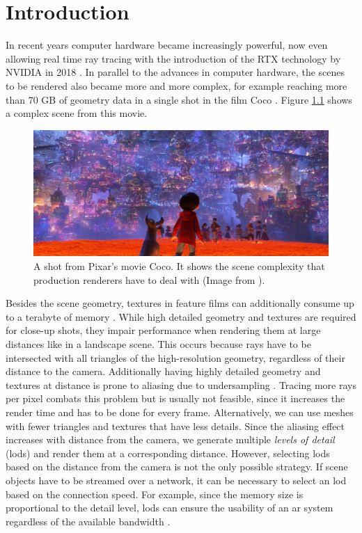 \chapter{Introduction}
\label{chap:intro}

In recent years computer hardware became increasingly powerful, now even allowing real time ray tracing with the introduction of the RTX technology by NVIDIA in 2018 \cite{turing_whitepaper}.
In parallel to the advances in computer hardware, the scenes to be rendered also became more and more complex, for example reaching more than 70 GB of geometry data in a single shot in the film Coco \cite{pixarxpu}.
Figure \ref{fig:coco} shows a complex scene from this movie.
\begin{figure}[t]
    \centering
    \includegraphics[width=1.0\linewidth]{img/coco1.jpg}
    \caption[A shot from the movie Coco]{A shot from Pixar's movie Coco. It shows the scene complexity that production renderers have to deal with (Image from \cite{coco}).}
    \label{fig:coco}
\end{figure}
Besides the scene geometry, textures in feature films can additionally consume up to a terabyte of memory \cite{arnold}.
While high detailed geometry and textures are required for close-up shots, they impair performance when rendering them at large distances like in a landscape scene.
This occurs because rays have to be intersected with all triangles of the high-resolution geometry, regardless of their distance to the camera.
Additionally having highly detailed geometry and textures at distance is prone to aliasing due to undersampling \cite{pbr}.
Tracing more rays per pixel combats this problem but is usually not feasible, since it increases the render time and has to be done for every frame.
Alternatively, we can use meshes with fewer triangles and textures that have less details.
Since the aliasing effect increases with distance from the camera, we generate multiple \textit{levels of detail} (\acsp{lod}) and render them at a corresponding distance.
However, selecting \acsp{lod} based on the distance from the camera is not the only possible strategy.
If scene objects have to be streamed over a network, it can be necessary to select an \ac{lod} based on the connection speed.
For example, since the memory size is proportional to the detail level, \acsp{lod} can ensure the usability of an \ac{ar} system regardless of the available bandwidth \cite{petrangeli_dynamic_adaptive_streaming}.

